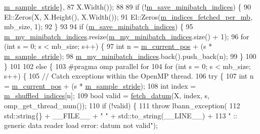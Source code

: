 \begin{DoxyCode}
      \hyperlink{classlbann_1_1generic__data__reader_a58461c39de7e17eafc5b98aec99cbb9b}{m\_sample\_stride}\},
87     X.Width());
88 
89   \textcolor{keywordflow}{if} (!\hyperlink{classlbann_1_1generic__data__reader_ab1d7cac44072bd1f67291c6169414112}{m\_save\_minibatch\_indices}) \{
90     El::Zeros(X, X.Height(), X.Width());
91     El::Zeros(\hyperlink{classlbann_1_1generic__data__reader_a4ee1a159c74561c15a5e0c267ad3cc6a}{m\_indices\_fetched\_per\_mb}, mb\_size, 1);
92   \}
93 
94   \textcolor{keywordflow}{if} (\hyperlink{classlbann_1_1generic__data__reader_ab1d7cac44072bd1f67291c6169414112}{m\_save\_minibatch\_indices}) \{
95     \hyperlink{classlbann_1_1generic__data__reader_a5048d99a58ccddf4fb170c6face8cf4e}{m\_my\_minibatch\_indices}.resize(\hyperlink{classlbann_1_1generic__data__reader_a5048d99a58ccddf4fb170c6face8cf4e}{m\_my\_minibatch\_indices}.size()
       + 1);
96     \textcolor{keywordflow}{for} (\textcolor{keywordtype}{int} s = 0; s < mb\_size; s++) \{
97       \textcolor{keywordtype}{int} n = \hyperlink{classlbann_1_1generic__data__reader_a2facf4e410099ac8c1fa586e797ec2e0}{m\_current\_pos} + (s * \hyperlink{classlbann_1_1generic__data__reader_a58461c39de7e17eafc5b98aec99cbb9b}{m\_sample\_stride});
98       \hyperlink{classlbann_1_1generic__data__reader_a5048d99a58ccddf4fb170c6face8cf4e}{m\_my\_minibatch\_indices}.back().push\_back(n);
99     \}
100   \}
101 
102   \textcolor{keywordflow}{else} \{
103 \textcolor{preprocessor}{    #pragma omp parallel for}
104     \textcolor{keywordflow}{for} (\textcolor{keywordtype}{int} s = 0; s < mb\_size; s++) \{
105       \textcolor{comment}{// Catch exceptions within the OpenMP thread.}
106       \textcolor{keywordflow}{try} \{
107         \textcolor{keywordtype}{int} n = \hyperlink{classlbann_1_1generic__data__reader_a2facf4e410099ac8c1fa586e797ec2e0}{m\_current\_pos} + (s * \hyperlink{classlbann_1_1generic__data__reader_a58461c39de7e17eafc5b98aec99cbb9b}{m\_sample\_stride});
108         \textcolor{keywordtype}{int} index = \hyperlink{classlbann_1_1generic__data__reader_aaab6aeff67ffff1c689336851fec2c57}{m\_shuffled\_indices}[n];
109         \textcolor{keywordtype}{bool} valid = \hyperlink{classlbann_1_1generic__data__reader_a0a3cd87ed4a7057df185e0087f2d21c1}{fetch\_datum}(X, index, s, omp\_get\_thread\_num());
110         \textcolor{keywordflow}{if} (!valid) \{
111           \textcolor{keywordflow}{throw} lbann\_exception(
112             std::string\{\} + \_\_FILE\_\_ + \textcolor{stringliteral}{" "} + std::to\_string(\_\_LINE\_\_) +
113             \textcolor{stringliteral}{" :: generic data reader load error: datum not valid"});

\end{DoxyCode}
